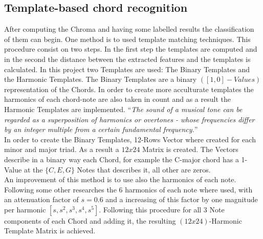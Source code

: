 \subsection{Template-based chord recognition}
\label{subsec:templates}

After computing the Chroma and having some labelled results the classification of them can begin. One method is to used template matching techniques. This procedure consist on two steps. In the first step the templates are computed and in the second the distance between the extracted features and the templates is calculated. In this project two Templates are used: The Binary Templates and the Harmonic Templates. The Binary Templates are a binary $([1,0]-Values)$ representation of the Chords. In order to create more acculturate templates the harmonics of each chord-note are also taken in count and as a result the Harmonic Templates are implemented.  “\textit{The sound of a musical tone can be regarded as a superposition of harmonics or overtones - whose frequencies differ by an integer multiple from a certain fundamental frequency.}” \cite{muller2007information}
\\
In order to create the Binary Templates, 12-Rows Vector where created for each minor and major triad. As a result a $12x24$ Matrix is created. The Vectors describe in a binary way each Chord, for example the C-major chord has a 1-Value at the $\{C,E,G\}$ Notes that describes it, all other are zeros.\\
An improvement of this method is to use also the harmonics of each note. Following some other researches\cite{gomez2006tonal}\cite{oudre2009chord} the 6 harmonics of each note where used, with an attenuation factor of $s=0.6$ and a increasing of this factor by one magnitude per harmonic $[s, s^2, s^3, s^4, s^5]$. Following this procedure for all 3 Note components of each Chord and adding it, the resulting $(12x24)$-Harmonic Template Matrix is achieved. 